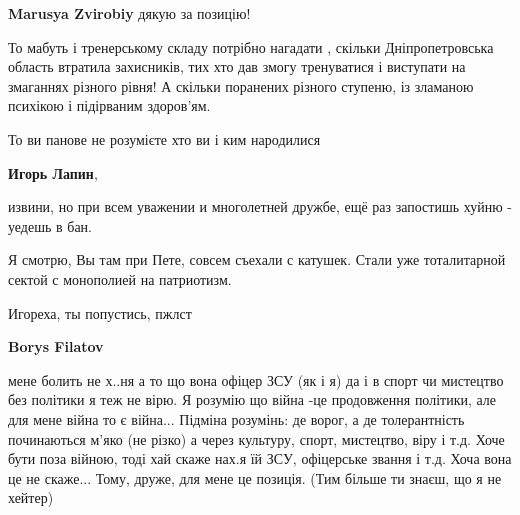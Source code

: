 \begin{itemize}
\begin{itemize}
\textbf{Marusya Zvirobiy} дякую за позицію!

\end{itemize}

 

То мабуть і тренерському складу потрібно нагадати , скільки Дніпропетровська
область втратила захисників, тих хто дав змогу тренуватися і виступати на
змаганнях різного рівня! А скільки поранених різного ступеню, із зламаною
психікою і підірваним здоров'ям.

То ви панове не розумієте хто ви і ким народилися

\begin{itemize}
 
\textbf{Игорь Лапин}, 

извини, но при всем уважении и многолетней дружбе, ещё раз запостишь хуйню -
уедешь в бан.

Я смотрю, Вы там при Пете, совсем съехали с катушек. Стали уже тоталитарной
сектой с монополией на патриотизм.

Игореха, ты попустись, пжлст

 

\textbf{Borys Filatov} 

мене болить не х..ня а то що вона офіцер ЗСУ (як і я) да
і в спорт чи мистецтво без політики я теж не вірю. Я розумію що війна -це
продовження політики, але для мене війна то є війна... Підміна розумінь: де
ворог, а де толерантність починаються м'яко (не різко) а через культуру, спорт,
мистецтво, віру і т.д. Хоче бути поза війною, тоді хай скаже нах.я їй ЗСУ,
офіцерське звання і т.д.  Хоча вона це не скаже... Тому, друже, для мене це
позиція. (Тим більше ти знаєш, що я не хейтер)


 

\end{itemize}
\end{itemize}
